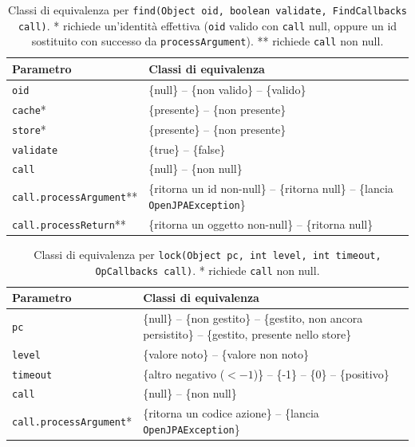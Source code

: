 \begin{table}[H]
\centering
\begin{tabularx}{\textwidth}{>{\raggedright\arraybackslash}p{} >{\raggedright\arraybackslash}X}
\toprule
Parametro & Classi di equivalenza \\
\midrule
\texttt{oid} & \{null\} -- \{non valido\} -- \{valido\} \\
\texttt{cache}* & \{presente\} -- \{non presente\} \\
\texttt{store}* & \{presente\} -- \{non presente\} \\
\midrule
\texttt{validate} & \{true\} -- \{false\} \\
\midrule
\texttt{call} & \{null\} -- \{non null\} \\
\texttt{call.processArgument}** & \{ritorna un id non-null\} -- \{ritorna null\} -- \{lancia
\texttt{OpenJPAException}\} \\
\texttt{call.processReturn}** & \{ritorna un oggetto non-null\} -- \{ritorna null\} \\
\bottomrule
\end{tabularx}
\caption{Classi di equivalenza per \texttt{find(Object oid, boolean validate, FindCallbacks call)}.
* richiede un'identità effettiva (\texttt{oid} valido con \texttt{call} null, oppure un id
sostituito con successo da \texttt{processArgument}). ** richiede \texttt{call} non null.}
\label{tab:find-classi}
\end{table}

\begin{table}[H]
\centering
\begin{tabularx}{\textwidth}{>{\raggedright\arraybackslash}p{} >{\raggedright\arraybackslash}X}
\toprule
Parametro & Classi di equivalenza \\
\midrule
\texttt{pc} & \{null\} -- \{non gestito\} -- \{gestito, non ancora persistito\} -- \{gestito,
presente nello store\} \\
\texttt{level} & \{valore noto\} -- \{valore non noto\} \\
\texttt{timeout} & \{altro negativo ($<-1$)\} -- \{-1\} -- \{0\} -- \{positivo\} \\
\midrule
\texttt{call} & \{null\} -- \{non null\} \\
\texttt{call.processArgument}* & \{ritorna un codice azione\} -- \{lancia \texttt{OpenJPAException}\} \\
\bottomrule
\end{tabularx}
\caption{Classi di equivalenza per \texttt{lock(Object pc, int level, int timeout,
OpCallbacks call)}. * richiede \texttt{call} non null.}
\label{tab:lock-classi}
\end{table}

